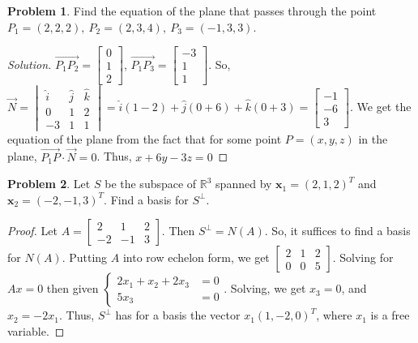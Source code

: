 \documentclass[oneside]{book}
\theoremstyle{definition}
\newtheorem{problem}{Problem}[section]
\newcommand*\B[1]{\mathbf{#1}}
\begin{document}
\begin{problem}
Find the equation of the plane that passes through the point $P_1 = (2,2,2),\ P_2 = (2,3,4),\ P_3 = (-1,3,3)$.
\end{problem}
\begin{proof}[Solution]
$\overrightarrow{P_1P_2} = \begin{bmatrix} 0 \\ 1 \\ 2 \end{bmatrix}$, $\overrightarrow{P_1 P_3} = \begin{bmatrix} -3 \\ 1 \\ 1 \end{bmatrix}$. So, $\overrightarrow{N} = \begin{vmatrix} \hat{i} & \hat{j} & \hat{k} \\ 0 & 1 & 2 \\ -3 & 1 & 1 \end{vmatrix} = \hat{i}(1-2) + \hat{j}(0+6) + \hat{k}(0+3)=\begin{bmatrix}-1 \\ -6 \\ 3\end{bmatrix}$. We get the equation of the plane from the fact that for some point $P=(x,y,z)$ in the plane, $\overrightarrow{P_1P}\cdot \overrightarrow{N} = 0$. Thus, $x + 6y - 3z =0$
\end{proof}

\begin{problem}
Let $S$ be the subspace of $\mathbb{R}^3$ spanned by $\B{x}_1 = (2,1,2)^T$ and $\B{x}_2 = (-2,-1,3)^T$. Find a basis for $S^{\perp}$.
\end{problem}
\begin{proof}
Let $A = \begin{bmatrix} 2 & 1 & 2 \\ -2 & -1 & 3\end{bmatrix}$. Then $S^{\perp} = N(A)$. So, it suffices to find a basis for $N(A)$. Putting $A$ into row echelon form, we get $\begin{bmatrix} 2 & 1 & 2 \\ 0 & 0 & 5 \end{bmatrix}$. Solving for $Ax = 0$ then given $\begin{cases} 2x_1 + x_2 + 2x_3 &= 0 \\ 5x_3 &= 0\end{cases}$. Solving, we get $x_3 = 0$, and $x_2 = - 2x_1$. Thus, $S^{\perp}$ has for a basis the vector $x_1(1,-2,0)^T$, where $x_1$ is a free variable.
\end{proof}
\end{document}
